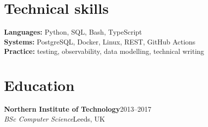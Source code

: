 \documentclass[10pt]{article}
\newcommand{\entry}[4]{\textbf{#1}\hfill #2\\\textit{#3}\hfill #4\\}
\begin{document}
\section*{Technical skills}
\textbf{Languages:} Python, SQL, Bash, TypeScript\\
\textbf{Systems:} PostgreSQL, Docker, Linux, REST, GitHub Actions\\
\textbf{Practice:} testing, observability, data modelling, technical writing
\section*{Education}
\entry{Northern Institute of Technology}{2013--2017}{BSc Computer Science}{Leeds, UK}
\end{document}
